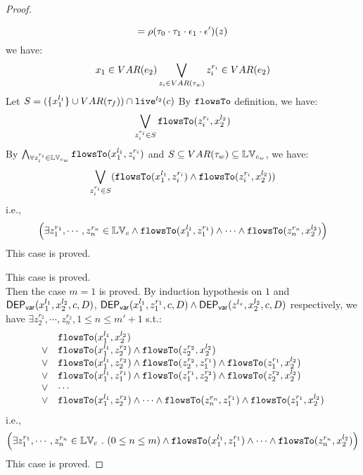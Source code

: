 {\begin{proof}
\begin{subproof}
\begin{enumerate}
\[  = \rho(\mathtt{\tau}_0 \cdot \mathtt{\tau}_1 \cdot \mathtt{\epsilon}_1\cdot \mathtt{\epsilon}')(z)
\]
%
we have:
\[
  x_1 \in VAR(e_2) \bigvee_{z_i \in VAR{(\mathtt{\tau}_w)}} z_i^{r_i} \in VAR(e_2)
\]
%
Let $S = (\{x_1^{l_1}\} \cup VAR{(\mathtt{\tau}_f)}) \cap \mathtt{live}^{l_2}(c) $
%
By $\mathtt{flowsTo}$ definition, we have:
\[
   \bigvee_{z_i^{r_i} \in S}  \mathtt{flowsTo}(z_i^{r_i}, x_2^{l_2})
\]
By $ \bigwedge_{\forall z_i^{r_i} \in \mathbb{LV}_{c_w}} \mathtt{flowsTo}(x_1^{l_1}, z_i^{r_i})$ and $S \subseteq VAR{(\mathtt{\tau}_w)} \subseteq \mathbb{LV}_{c_w}$, we have:
\[
\bigvee_{z_i^{r_i} \in S} 
(\mathtt{flowsTo}(x_1^{l_1}, z_i^{r_i}) \land \mathtt{flowsTo}(z_i^{r_i}, x_2^{l_2}))
\]
%
i.e.,
\[
\Big(\exists z_1^{r_1}, \cdots, z_n^{r_n} \in \mathbb{LV}_{{c}}
 \land \mathtt{flowsTo}(x_1^{l_1}, z_1^{r_1}) \land \cdots \land \mathtt{flowsTo}(z_n^{r_n}, {x}_2^{l_2}) \Big)
\]
%
This case is proved.
\end{enumerate}
\end{subproof}
%
This case is proved.
%
\\
Then the case $m = 1$ is proved.
%
By induction hypothesis on $1$ and $\mathsf{DEP_{var}}(x_1^{l_1}, x_2^{l_2}, c, D)$, 
$\mathsf{DEP_{var}}(x_1^{l_1}, z_1^{r_1}, c, D) \land \mathsf{DEP_{var}}(z^{l_z}, x_2^{l_2}, c, D)$ respectively, 
we have $\exists z_2^{r_2}, \cdots, z_n^{r_2}, 1 \leq n \leq m'+1$ s.t.:
\[
\begin{array}{ll}
      & \mathtt{flowsTo}(x_1^{l_1}, x_2^{l_2}) \\
  \lor  & \mathtt{flowsTo}(x_1^{l_1}, z_2^{r_2}) \land \mathtt{flowsTo}(z_2^{r_2}, x_2^{l_2})\\
  \lor  & \mathtt{flowsTo}(x_1^{l_1}, z_2^{r_2}) \land \mathtt{flowsTo}(z_2^{r_2}, z_1^{r_1}) \land \mathtt{flowsTo}(z_1^{r_1}, x_2^{l_2}) \\
  \lor  & \mathtt{flowsTo}(x_1^{l_1}, z_1^{r_1}) \land \mathtt{flowsTo}(z_1^{r_1}, z_2^{r_2}) \land \mathtt{flowsTo}(z_2^{r_2}, x_2^{l_2}) \\
  \lor  & \cdots \\
  \lor  & \mathtt{flowsTo}(x_1^{l_1}, z_2^{r_2}) \land \cdots \land \mathtt{flowsTo}(z_n^{r_n}, z_1^{r_1}) \land \mathtt{flowsTo}(z_1^{r_1}, x_2^{l_2}) \\
\end{array}
\]
i.e.,
\[
\Big(\exists z_1^{r_1}, \cdots, z_n^{r_n} \in \mathbb{LV}_{{c}} ~.~ (0 \leq n \leq m )
 \land \mathtt{flowsTo}(x_1^{l_1}, z_1^{r_1}) \land \cdots \land \mathtt{flowsTo}(z_n^{r_n}, {x}_2^{l_2}) \Big)
\]
This case is proved.


\end{proof}}
